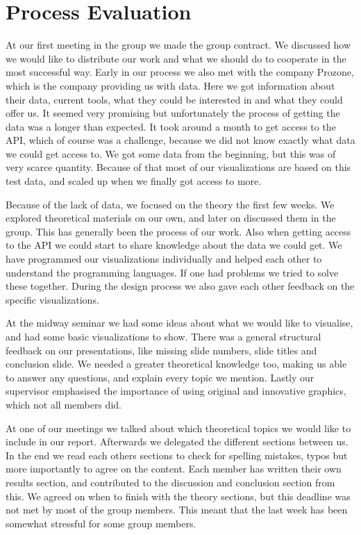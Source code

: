 \documentclass[Report.tex]{subfiles}
\begin{document}
\section*{Process Evaluation}
\pagestyle{empty}
At our first meeting in the group we made the group contract. We discussed how we would like to distribute our work and what we should do to cooperate in the most successful way. Early in our process we also met with the company Prozone, which is the company providing us with data. Here we got information about their data, current tools, what they could be interested in and what they could offer us. It seemed very promising but unfortunately the process of getting the data was a longer than expected. It took around a month to get access to the API, which of course was a challenge, because we did not know exactly what data we could get access to. We got some data from the beginning, but this was of very scarce quantity. Because of that most of our visualizations are based on this test data, and scaled up when we finally got access to more.

Because of the lack of data, we focused on the theory the first few weeks. We explored  theoretical materials on our own, and later on discussed them in the group. This has generally been the process of our work. Also when getting access to the API we could start to share knowledge about the data we could get. We have programmed our visualizations individually and helped each other to understand the programming languages. If one had problems we tried to solve these together. During the design process we also gave each other feedback on the specific visualizations. 

At the midway seminar we had some ideas about what we would like to visualise, and had some basic visualizations to show. There was a general structural feedback on our presentations, like missing slide numbers, slide titles and conclusion slide. We needed a greater theoretical knowledge too, making us able to answer any questions, and explain every topic we mention. Lastly our supervisor emphasised the importance of using original and innovative graphics, which not all members did.

At one of our meetings we talked about which theoretical topics we would like to include in our report. Afterwards we delegated the different sections between us.  In the end we read each others sections to check for spelling mistakes, typos but more importantly to agree on the content. Each member has written their own results section, and contributed to the discussion and conclusion section from this. We agreed on when to  finish with the theory sections, but this deadline was not met by most of the group members. This meant that the last week has been somewhat stressful for some group members.
\end{document}

